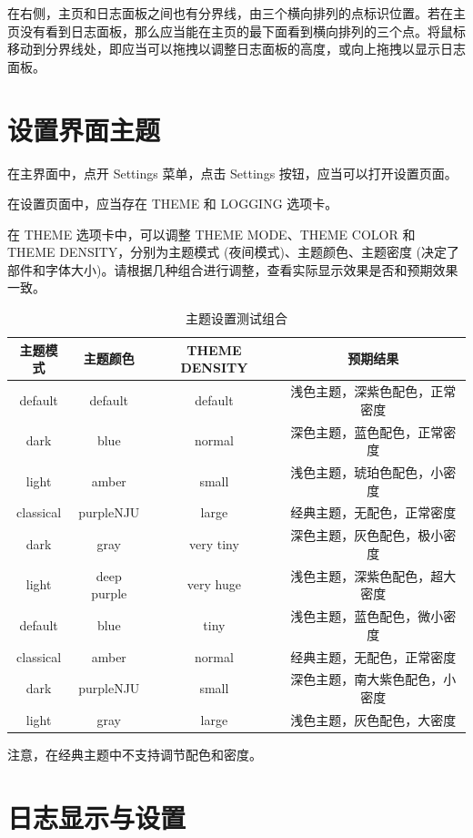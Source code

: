 \documentclass[a4paper,12pt]{report}	%
\begin{document}
在右侧，主页和日志面板之间也有分界线，由三个横向排列的点标识位置。若在主页没有看到日志面板，那么应当能在主页的最下面看到横向排列的三个点。将鼠标移动到分界线处，即应当可以拖拽以调整日志面板的高度，或向上拖拽以显示日志面板。

\section{设置界面主题}

在主界面中，点开 Settings 菜单，点击 Settings 按钮，应当可以打开设置页面。

在设置页面中，应当存在 THEME 和 LOGGING 选项卡。

在 THEME 选项卡中，可以调整 THEME MODE、THEME COLOR 和 THEME DENSITY，分别为主题模式 (夜间模式)、主题颜色、主题密度 (决定了部件和字体大小)。请根据几种组合进行调整，查看实际显示效果是否和预期效果一致。

\begin{table}[H]
\centering
\caption{主题设置测试组合}
\begin{tabular}{cccc}
\toprule
主题模式 & 主题颜色 & THEME DENSITY & 预期结果 \\
\midrule
default & default & default & 浅色主题，深紫色配色，正常密度 \\
dark & blue & normal & 深色主题，蓝色配色，正常密度 \\
light & amber & small & 浅色主题，琥珀色配色，小密度 \\
classical & purpleNJU & large & 经典主题，无配色，正常密度 \\
dark & gray & very tiny & 深色主题，灰色配色，极小密度 \\
light & deep purple & very huge & 浅色主题，深紫色配色，超大密度 \\
default & blue & tiny & 浅色主题，蓝色配色，微小密度 \\
classical & amber & normal & 经典主题，无配色，正常密度 \\
dark & purpleNJU & small & 深色主题，南大紫色配色，小密度 \\
light & gray & large & 浅色主题，灰色配色，大密度 \\
\bottomrule
\end{tabular}
\end{table}

注意，在经典主题中不支持调节配色和密度。

\section{日志显示与设置}
\end{document}
